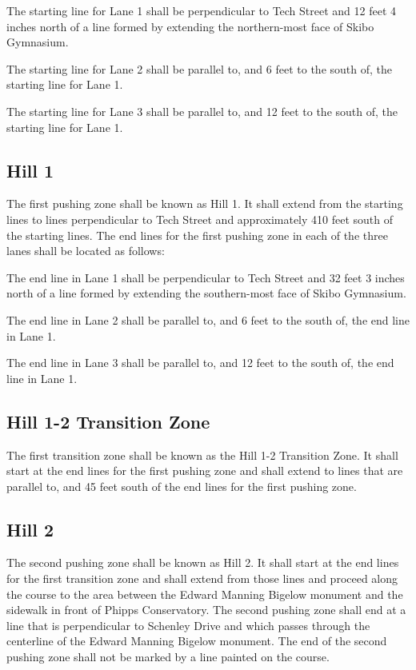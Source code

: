 \documentclass[openany]{book}
\begin{document}
The starting line for Lane 1 shall be perpendicular to Tech Street and 12 feet 4 inches north of a line formed by extending the northern-most face of Skibo Gymnasium.

The starting line for Lane 2 shall be parallel to, and 6 feet to the south of, the starting line for Lane 1.

The starting line for Lane 3 shall be parallel to, and 12 feet to the south of, the starting line for Lane 1.

\subsection{Hill 1}

The first pushing zone shall be known as Hill 1. It shall extend from the starting lines to lines perpendicular to Tech Street and approximately 410 feet south of the starting lines. The end lines for the first pushing zone in each of the three lanes shall be located as follows:

The end line in Lane 1 shall be perpendicular to Tech Street and 32 feet 3 inches north of a line formed by extending the southern-most face of Skibo Gymnasium.

The end line in Lane 2 shall be parallel to, and 6 feet to the south of, the end line in Lane 1.

The end line in Lane 3 shall be parallel to, and 12 feet to the south of, the end line in Lane 1.

\subsection{Hill 1-2 Transition Zone}

The first transition zone shall be known as the Hill 1-2 Transition Zone. It shall start at the end lines for the first pushing zone and shall extend to lines that are parallel to, and 45 feet south of the end lines for the first pushing zone.

\subsection{Hill 2}

The second pushing zone shall be known as Hill 2. It shall start at the end lines for the first transition zone and shall extend from those lines and proceed along the course to the area between the Edward Manning Bigelow monument and the sidewalk in front of Phipps Conservatory. The second pushing zone shall end at a line that is perpendicular to Schenley Drive and which passes through the centerline of the Edward Manning Bigelow monument. The end of the second pushing zone shall not be marked by a line painted on the course.
\end{document}

